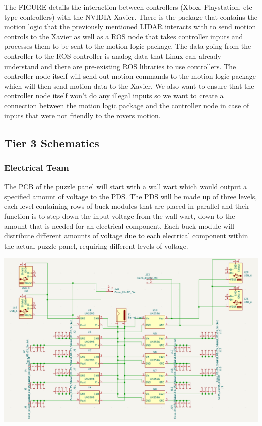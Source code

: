 \documentclass[a4paper, 10pt]{article}
\begin{document}
		The FIGURE details the interaction between controllers (Xbox, Playstation, etc type controllers) with the NVIDIA Xavier. There is the package that contains the motion logic that the previously mentioned LIDAR interacts with to send motion controls to the Xavier as well as a ROS node that takes controller inputs and processes them to be sent to the motion logic package. The data going from the controller to the ROS controller is analog data that Linux can already understand and there are pre-existing ROS libraries to use controllers. The controller node itself will send out motion commands to the motion logic package which will then send motion data to the Xavier. We also want to ensure that the controller node itself won't do any illegal inputs so we want to create a connection between the motion logic package and the controller node in case of inputs that were not friendly to the rovers motion.	
	
	\subsection{Tier 3 Schematics}
		\subsubsection{Electrical Team}
		The PCB of the puzzle panel will start with a wall wart which would output a specified amount of voltage to the PDS. The PDS will be made up of three levels, each level containing rows of buck modules that are placed in parallel and their function is to step-down the input voltage from the wall wart, down to the amount that is needed for an electrical component. Each buck module will distribute different amounts of voltage due to each electrical component within the actual puzzle panel, requiring different levels of voltage.
		
		\includegraphics[scale=0.7]{Photos/Puzzle Panel schematic 1}	
\end{document}
